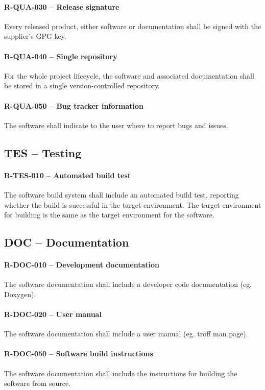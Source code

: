 \paragraph{R-QUA-030 -- Release signature}
Every released product, either software or documentation shall be signed
with the supplier's GPG key.

\paragraph{R-QUA-040 -- Single repository}
For the whole project lifecycle, the software and associated documentation shall
be stored in a single version-controlled repository.

\paragraph{R-QUA-050 -- Bug tracker information}
The software shall indicate to the user where to report bugs and issues.

\subsection{TES -- Testing}
\paragraph{R-TES-010 -- Automated build test}
The software build system shall include an automated build test, reporting
whether the build is successful in the target environment.
The target environment for building is the same as the target environment for
the software.

\subsection{DOC -- Documentation}
\paragraph{R-DOC-010 -- Development documentation}
The software documentation shall include a developer code documentation (eg.
Doxygen).

\paragraph{R-DOC-020 -- User manual}
The software documentation shall include a user manual (eg. troff man page).

\paragraph{R-DOC-050 -- Software build instructions}
The software documentation shall include the instructions for building
the software from source.

